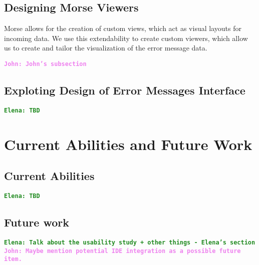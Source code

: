 \documentclass[12pt]{article}
\newcommand{\comment}[1]{{\bf \tt  {#1}}}
\newcommand{\emcomment}[1]{\textcolor{ForestGreen}{\comment{Elena: {#1}}}}
\newcommand{\jwcomment}[1]{\textcolor{violet}{\comment{John: {#1}}}}
\begin{document}
\subsection{Designing Morse Viewers}\label{subsec:Morse-Viewers}
Morse allows for the creation of custom views, which act as visual layouts for incoming data. 
We use this extendability to create custom viewers, which allow us to create and tailor the visualization of the error message data.


\jwcomment{John's subsection}

\subsection{Exploting Design of Error Messages Interface}\label{subsec:interface}
\emcomment{TBD}

		
\section{Current Abilities and Future Work}\label{sec:conclusion}
	\subsection{Current Abilities}\label{subsec:current-abilities}
	\emcomment{TBD}
	

	\subsection{Future work}\label{subsec:future}
	\emcomment{Talk about the usability study + other things - Elena's section}
	\jwcomment{Maybe mention potential IDE integration as a possible future item.}



\end{document}
